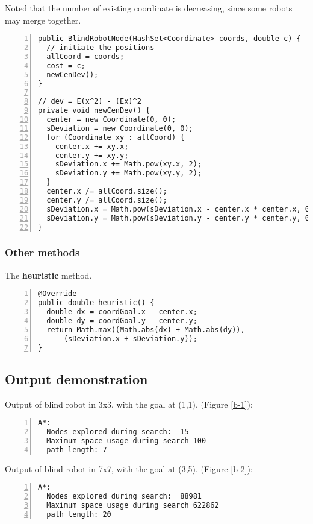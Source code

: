 \documentclass{article}
\begin{document}
Noted that the number of existing coordinate is decreasing, since some robots may merge together.
\begin{lstlisting}[numbers=left]
public BlindRobotNode(HashSet<Coordinate> coords, double c) {
  // initiate the positions
  allCoord = coords;
  cost = c;
  newCenDev();
}

// dev = E(x^2) - (Ex)^2
private void newCenDev() {
  center = new Coordinate(0, 0);
  sDeviation = new Coordinate(0, 0);
  for (Coordinate xy : allCoord) {
    center.x += xy.x;
    center.y += xy.y;
    sDeviation.x += Math.pow(xy.x, 2);
    sDeviation.y += Math.pow(xy.y, 2);
  }
  center.x /= allCoord.size();
  center.y /= allCoord.size();
  sDeviation.x = Math.pow(sDeviation.x - center.x * center.x, 0.5);
  sDeviation.y = Math.pow(sDeviation.y - center.y * center.y, 0.5);
}
\end{lstlisting}

\subsubsection{Other methods}



The \textbf{heuristic} method.
\begin{lstlisting}[numbers=left]
@Override
public double heuristic() {
  double dx = coordGoal.x - center.x;
  double dy = coordGoal.y - center.y;
  return Math.max((Math.abs(dx) + Math.abs(dy)),
      (sDeviation.x + sDeviation.y));
}
\end{lstlisting}










\subsection{Output demonstration}

Output of blind robot in 3x3, with the goal at (1,1). (Figure \ref{b-1}):
\begin{lstlisting}[numbers=left]
A*:  
  Nodes explored during search:  15
  Maximum space usage during search 100
  path length: 7
\end{lstlisting}

Output of blind robot in 7x7, with the goal at (3,5). (Figure \ref{b-2}):
\begin{lstlisting}[numbers=left]
A*: 
  Nodes explored during search:  88981
  Maximum space usage during search 622862
  path length: 20
\end{lstlisting}
\end{document}
